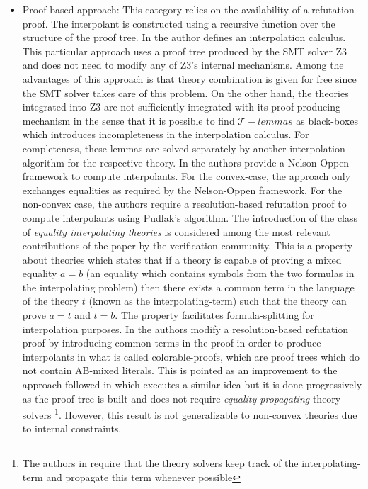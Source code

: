 \begin{itemize}
  \item Proof-based approach: This category relies on the availability
    of a refutation proof.  The interpolant is constructed using a
    recursive function over the structure of the proof
    tree. In \cite{10.1007/978-3-540-24730-2_2,mcmillan2011interpolants}
    the author defines an interpolation calculus. This particular
    approach uses a proof tree produced by the SMT solver Z3 
    and does not need to modify any of Z3's internal mechanisms.
    Among the advantages of this approach is that
    theory combination is given for free since the SMT solver takes care of this
    problem. On the other hand, the theories integrated into Z3 are not sufficiently integrated with its
    proof-producing mechanism in the sense that it is possible to find $\mathcal{T}-lemmas$
    as black-boxes which introduces incompleteness in the
    interpolation calculus. For completeness, these lemmas are 
    solved separately by another interpolation algorithm for the respective
    theory. 
    In \cite{10.1007/11532231_26} the authors provide a Nelson-Oppen framework
    to compute interpolants. For the convex-case, the approach only 
    exchanges equalities as required by the Nelson-Oppen framework. For
    the non-convex case, the authors require a resolution-based refutation proof
    to compute interpolants using Pudlak's algorithm. The introduction of the
    class of \emph{equality interpolating theories} is 
    considered among the most relevant contributions of the paper 
    by the verification community. This is a property about theories which states
    that if a theory is capable of proving a mixed equality $a = b$ (an equality
    which contains symbols from the two formulas in the interpolating problem)
    then there exists a common term in the language of the theory $t$ (known as
    the interpolating-term) such that 
    the theory can prove $a = t$ and $t = b$. The property facilitates 
    formula-splitting for interpolation purposes.
    In \cite{10.1007/978-3-642-00768-2_34} the authors modify a 
    resolution-based refutation proof by introducing common-terms in 
    the proof in order to produce interpolants in what is called
    colorable-proofs, which are proof trees which do not contain AB-mixed
    literals. This is pointed as an improvement to the approach followed 
    in \cite{10.1007/11532231_26} which executes a similar idea but it is done 
    progressively as the proof-tree is built and does not require 
   \emph{equality propagating} theory solvers
    \footnote{The authors in \cite{10.1007/11532231_26} require that 
      the theory solvers keep track of the interpolating-term 
      and propagate this term whenever
    possible}. 
    However, this result is not generalizable
    to non-convex theories due to internal constraints.


\end{itemize}
